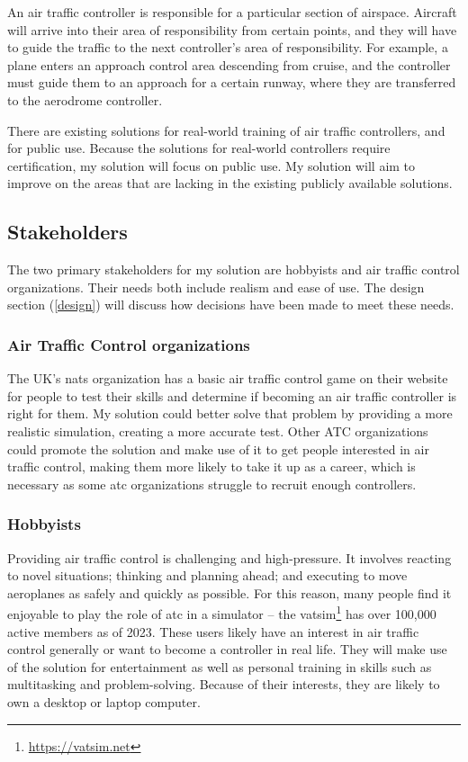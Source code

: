 \documentclass{article}
\begin{document}
An air traffic controller is responsible for a particular section of \gls{airspace}.
Aircraft will arrive into their area of responsibility from certain points, and they will have to guide the traffic to the next controller's area of responsibility.
For example, a plane enters an approach control area descending from cruise, and the controller must guide them to an approach for a certain runway, where they are transferred to the aerodrome controller.

There are existing solutions for real-world training of air traffic controllers, and for public use.
Because the solutions for real-world controllers require certification, my solution will focus on public use.
My solution will aim to improve on the areas that are lacking in the existing publicly available solutions.


\subsection{Stakeholders}
The two primary stakeholders for my solution are hobbyists and air traffic control organizations.
Their needs both include realism and ease of use.
The design section (\ref{design}) will discuss how decisions have been made to meet these needs.

\subsubsection{Air Traffic Control organizations}
The UK's \acrfull{nats} organization has a basic air traffic control game on their website for people to test their skills and determine if becoming an air traffic controller is right for them.
My solution could better solve that problem by providing a more realistic simulation, creating a more accurate test.
Other ATC organizations could promote the solution and make use of it to get people interested in air traffic control, making them more likely to take it up as a career, which is necessary as some \acrshort{atc} organizations struggle to recruit enough controllers\cite{indiaatcshortage}.

\subsubsection{Hobbyists}
Providing air traffic control is challenging and high-pressure.
It involves reacting to novel situations; thinking and planning ahead; and executing to move aeroplanes as safely and quickly as possible\cite{natsbuzz}.
For this reason, many people find it enjoyable to play the role of \acrshort{atc} in a simulator -- the \acrfull{vatsim}\footnote{\url{https://vatsim.net}} has over 100,000 active members as of 2023.
These users likely have an interest in air traffic control generally or want to become a controller in real life.
They will make use of the solution for entertainment as well as personal training in skills such as multitasking and problem-solving.
Because of their interests, they are likely to own a desktop or laptop computer.
\end{document}
